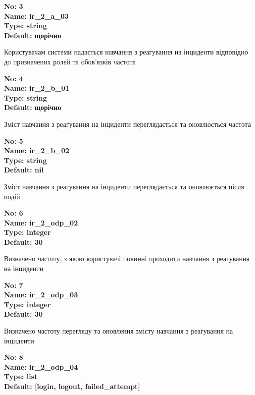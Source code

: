 \documentclass{article}
\begin{document}
{\footnotesize\bfseries
No: 3\\
Name: ir\_\allowbreak{}2\_\allowbreak{}a\_\allowbreak{}03\\
Type: string\\
Default: \textquotedbl{}щорічно\textquotedbl{}
}

{\footnotesize Користувачам системи надається навчання з реагування на інциденти відповідно до призначених ролей та обов'язків частота}


{\footnotesize\bfseries
No: 4\\
Name: ir\_\allowbreak{}2\_\allowbreak{}b\_\allowbreak{}01\\
Type: string\\
Default: \textquotedbl{}щорічно\textquotedbl{}
}

{\footnotesize Зміст навчання з реагування на інциденти переглядається та оновлюється частота}


{\footnotesize\bfseries
No: 5\\
Name: ir\_\allowbreak{}2\_\allowbreak{}b\_\allowbreak{}02\\
Type: string\\
Default: nil
}

{\footnotesize Зміст навчання з реагування на інциденти переглядається та оновлюється після подій}


{\footnotesize\bfseries
No: 6\\
Name: ir\_\allowbreak{}2\_\allowbreak{}odp\_\allowbreak{}02\\
Type: integer\\
Default: 30
}

{\footnotesize Визначено частоту, з якою користувачі повинні проходити навчання з реагування на інциденти}


{\footnotesize\bfseries
No: 7\\
Name: ir\_\allowbreak{}2\_\allowbreak{}odp\_\allowbreak{}03\\
Type: integer\\
Default: 30
}

{\footnotesize Визначено частоту перегляду та оновлення змісту навчання з реагування на інциденти}


{\footnotesize\bfseries
No: 8\\
Name: ir\_\allowbreak{}2\_\allowbreak{}odp\_\allowbreak{}04\\
Type: list\\
Default: [\textquotedbl{}login\textquotedbl{}, \textquotedbl{}logout\textquotedbl{}, \textquotedbl{}failed\_\allowbreak{}attempt\textquotedbl{}]
}
\end{document}
